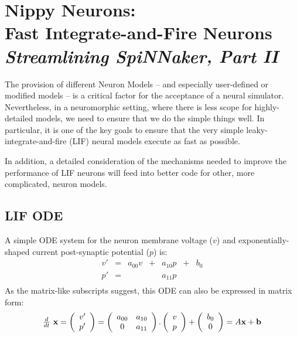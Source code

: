 \chapter[Nippy Neurons]{Nippy Neurons:\\
Fast Integrate-and-Fire Neurons\\
{\it Streamlining SpiNNaker, Part II}}

The provision of different Neuron Models -- and especially
user-defined or modified models -- is a critical factor for the
acceptance of a neural simulator. Nevertheless, in a neuromorphic
setting, where there is less scope for highly-detailed models, we need
to ensure that we do the simple things well. In particular, it is one
of the key goals to ensure that the very simple
leaky-integrate-and-fire (LIF) neural models execute as fast as
possible.

In addition, a detailed consideration of the mechanisms needed to
improve the performance of LIF neurons will feed into better code
for other, more complicated, neuron models.

\section{LIF ODE}

A simple ODE system for the neuron membrane voltage ($v$) and
exponentially-shaped current post-synaptic potential ($p$) is:
\[\begin{array}{ccrcrcr}
v' & = & a_{00} v  &+& a_{10} p &+& b_0\\
p' & = & & & a_{11} p\\
\end{array}\]
As the matrix-like subscripts suggest, this ODE can also be expressed
in matrix form:
\[\begin{array}[c]{c}
\frac{d}{dt}~\mbox{\bf x} = \left(\begin{array}[c]{c} v' \\ p' \end{array}\right)
=\left(\begin{array}[c]{cc} 
a_{00} & a_{10}\\
 0 &  a_{11}\end{array}\right) . \left(\begin{array}[c]{c} v \\ p \end{array}\right) + \left(\begin{array}[c]{c}b_0\\0\end{array}\right)
= A \mbox{\bf x} +
    \mbox{\bf b}
\end{array}\]

